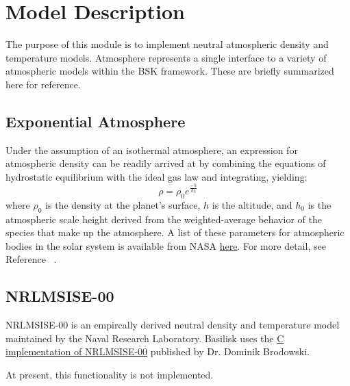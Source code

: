 
\section{Model Description}

The purpose of this module is to implement neutral atmospheric density and temperature models.
Atmosphere represents a single interface to a variety of atmospheric models within the BSK framework. These are briefly summarized here for reference.


\subsection{Exponential Atmosphere}
Under the assumption of an isothermal atmosphere, an expression for atmospheric density can be readily arrived at by combining the equations of hydrostatic equilibrium with the ideal gas law and integrating, yielding:
\begin{equation}
\label{eq:expAtmo}
\rho = \rho_0 e^{\frac{-h}{h_0}}
\end{equation}
where $\rho_0$ is the density at the planet's surface, $h$ is the altitude, and $h_0$ is the atmospheric scale height derived from the weighted-average behavior of the species that make up the atmosphere. A list of these parameters
for atmospheric bodies in the solar system is available from NASA \href{https://nssdc.gsfc.nasa.gov/planetary/planetfact.html}{here}. For more detail, see Reference ~. 

\subsection{NRLMSISE-00}
NRLMSISE-00 is an empircally derived neutral density and temperature model maintained by the Naval Research Laboratory. Basilisk uses the \href{https://www.brodo.de/space/nrlmsise/index.html}{C implementation of NRLMSISE-00} published by Dr. Dominik Brodowski.

At present, this functionality is not implemented.
